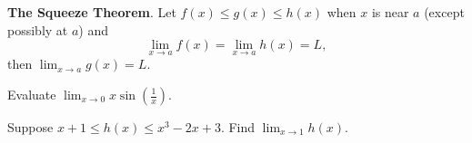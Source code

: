 \documentclass[../main.tex]{subfiles}
\begin{document}
\begin{mdframed}[style=withref]
  \textbf{The Squeeze Theorem}. Let {\(f(x) \le g(x) \le h(x)\)} when \(x\) is near \(a\) (except possibly at \(a\)) and
  \[ { \lim_{x \to a} f(x) = \lim_{x \to a} h(x) = L,} \]
  then
  {\(\lim_{x \to a} g(x) = L\).}

\end{mdframed}

\begin{example}
  Evaluate \(\lim_{x \to 0} x \sin\left(\frac{1}{x}\right)\).

  \hfill

\end{example}
\clearpage

\begin{example}
  Suppose \(x+1 \le h(x) \le x^{3} - 2x + 3\). Find \(\lim_{x \to 1} h(x)\).

\end{example}
\end{document}
